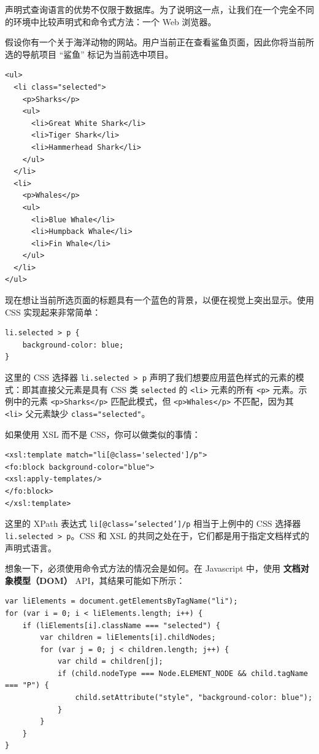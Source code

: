 声明式查询语言的优势不仅限于数据库。为了说明这一点，让我们在一个完全不同的环境中比较声明式和命令式方法：一个 Web 浏览器。

假设你有一个关于海洋动物的网站。用户当前正在查看鲨鱼页面，因此你将当前所选的导航项目 “鲨鱼” 标记为当前选中项目。

\begin{lstlisting}
<ul>
  <li class="selected">
    <p>Sharks</p>
    <ul>
      <li>Great White Shark</li>
      <li>Tiger Shark</li>
      <li>Hammerhead Shark</li>
    </ul>
  </li>
  <li>
    <p>Whales</p>
    <ul>
      <li>Blue Whale</li>
      <li>Humpback Whale</li>
      <li>Fin Whale</li>
    </ul>
  </li>
</ul>
\end{lstlisting}

现在想让当前所选页面的标题具有一个蓝色的背景，以便在视觉上突出显示。使用 CSS 实现起来非常简单：

\begin{lstlisting}
li.selected > p {
    background-color: blue;
}   
\end{lstlisting}

这里的 CSS 选择器 \texttt{li.selected > p} 声明了我们想要应用蓝色样式的元素的模式：即其直接父元素是具有 CSS 类 \texttt{selected} 的 \texttt{<li>} 元素的所有 \texttt{<p>} 元素。示例中的元素 \texttt{<p>Sharks</p>} 匹配此模式，但 \texttt{<p>Whales</p>} 不匹配，因为其 \texttt{<li>} 父元素缺少 \texttt{class="selected"}。

如果使用 XSL 而不是 CSS，你可以做类似的事情：

\begin{lstlisting}
<xsl:template match="li[@class='selected']/p">
<fo:block background-color="blue">
<xsl:apply-templates/>
</fo:block>
</xsl:template>
\end{lstlisting}

这里的 XPath 表达式 \texttt{li[@class='selected']/p} 相当于上例中的 CSS 选择器 \texttt{li.selected > p}。CSS 和 XSL 的共同之处在于，它们都是用于指定文档样式的声明式语言。

想象一下，必须使用命令式方法的情况会是如何。在 Javascript 中，使用 \textbf{文档对象模型（DOM）} API，其结果可能如下所示：

\begin{lstlisting}
var liElements = document.getElementsByTagName("li");
for (var i = 0; i < liElements.length; i++) {
    if (liElements[i].className === "selected") {
        var children = liElements[i].childNodes;
        for (var j = 0; j < children.length; j++) {
            var child = children[j];
            if (child.nodeType === Node.ELEMENT_NODE && child.tagName === "P") {
                child.setAttribute("style", "background-color: blue");
            }
        }
    }
}
\end{lstlisting}

